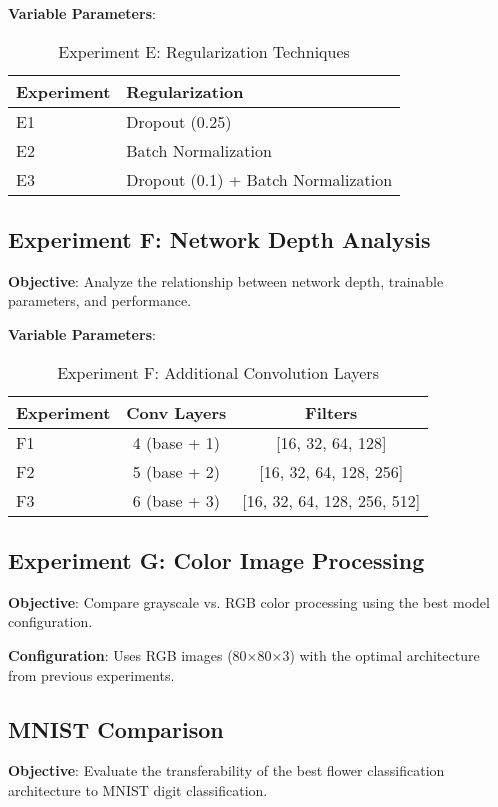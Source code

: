 \documentclass[12pt,a4paper]{article}
\begin{document}
\textbf{Variable Parameters}:
\begin{table}[H]
\centering
\caption{Experiment E: Regularization Techniques}
\begin{tabular}{ll}
\toprule
\textbf{Experiment} & \textbf{Regularization} \\
\midrule
E1 & Dropout (0.25) \\
E2 & Batch Normalization \\
E3 & Dropout (0.1) + Batch Normalization \\
\bottomrule
\end{tabular}
\end{table}

\subsection{Experiment F: Network Depth Analysis}
\textbf{Objective}: Analyze the relationship between network depth, trainable parameters, and performance.

\textbf{Variable Parameters}:
\begin{table}[H]
\centering
\caption{Experiment F: Additional Convolution Layers}
\begin{tabular}{lcc}
\toprule
\textbf{Experiment} & \textbf{Conv Layers} & \textbf{Filters} \\
\midrule
F1 & 4 (base + 1) & [16, 32, 64, 128] \\
F2 & 5 (base + 2) & [16, 32, 64, 128, 256] \\
F3 & 6 (base + 3) & [16, 32, 64, 128, 256, 512] \\
\bottomrule
\end{tabular}
\end{table}

\subsection{Experiment G: Color Image Processing}
\textbf{Objective}: Compare grayscale vs. RGB color processing using the best model configuration.

\textbf{Configuration}: Uses RGB images (80×80×3) with the optimal architecture from previous experiments.

\subsection{MNIST Comparison}
\textbf{Objective}: Evaluate the transferability of the best flower classification architecture to MNIST digit classification.
\end{document}
